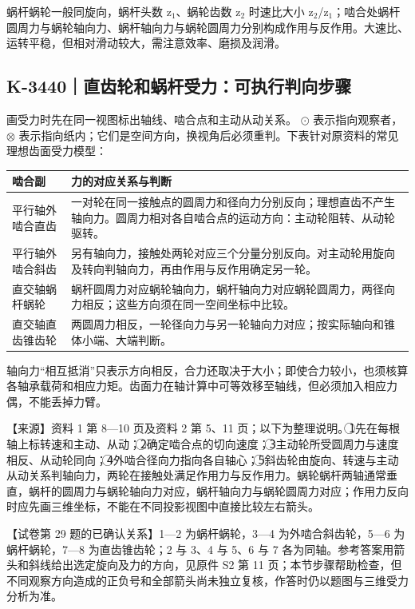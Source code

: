 \documentclass[zihao=5,a4paper,UTF8,fontset=fandol]{ctexart}
\begin{document}
蜗杆蜗轮一般同旋向，蜗杆头数 z$_{1}$、蜗轮齿数 z$_{2}$ 时速比大小 z$_{2}$/z$_{1}$；啮合处蜗杆圆周力与蜗轮轴向力、蜗杆轴向力与蜗轮圆周力分别构成作用与反作用。大速比、运转平稳，但相对滑动较大，需注意效率、磨损及润滑。





\subsection{K-3440｜直齿轮和蜗杆受力：可执行判向步骤}
\label{k-3440}

画受力时先在同一视图标出轴线、啮合点和主动从动关系。 $\odot$ 表示指向观察者，$\otimes$ 表示指向纸内；它们是空间方向，换视角后必须重判。下表针对原资料的常见理想齿面受力模型：


\begin{longtable}{p{7.51cm}p{7.51cm}}
\toprule
啮合副 & 力的对应关系与判断 \\

\midrule
\endhead
平行轴外啮合直齿 & 一对轮在同一接触点的圆周力和径向力分别反向；理想直齿不产生轴向力。圆周力相对各自啮合点的运动方向：主动轮阻转、从动轮驱转。 \\
平行轴外啮合斜齿 & 另有轴向力，接触处两轮对应三个分量分别反向。对主动轮用旋向及转向判轴向力，再由作用与反作用确定另一轮。 \\
直交轴蜗杆蜗轮 & 蜗杆圆周力对应蜗轮轴向力，蜗杆轴向力对应蜗轮圆周力，两径向力相反；这些方向须在同一空间坐标中比较。 \\
直交轴直齿锥齿轮 & 两圆周力相反，一轮径向力与另一轮轴向力对应；按实际轴向和锥体小端、大端判断。 \\
\bottomrule
\end{longtable}

轴向力“相互抵消”只表示方向相反，合力还取决于大小；即使合力较小，也须核算各轴承载荷和相应力矩。齿面力在轴计算中可等效移至轴线，但必须加入相应力偶，不能丢掉力臂。


【来源】资料 1 第 8—10 页及资料 2 第 5、11 页；以下为整理说明。\textcircled{1}先在每根轴上标转速和主动、从动；\textcircled{2}确定啮合点的切向速度；\textcircled{3}主动轮所受圆周力与速度相反、从动轮同向；\textcircled{4}外啮合径向力指向各自轴心；\textcircled{5}斜齿轮由旋向、转速与主动从动关系判轴向力，两轮在接触处满足作用力与反作用力。蜗轮蜗杆两轴通常垂直，蜗杆的圆周力与蜗轮轴向力对应，蜗杆轴向力与蜗轮圆周力对应；作用力反向时应先画三维坐标，不能在不同投影视图中直接比较左右箭头。


【试卷第 29 题的已确认关系】1—2 为蜗杆蜗轮，3—4 为外啮合斜齿轮，5—6 为蜗杆蜗轮，7—8 为直齿锥齿轮；2 与 3、4 与 5、6 与 7 各为同轴。参考答案用箭头和斜线给出选定旋向及力的方向，见原件 S2 第 11 页；本节步骤帮助检查，但不同观察方向造成的正负号和全部箭头尚未独立复核，作答时仍以题图与三维受力分析为准。
\end{document}
